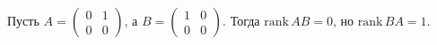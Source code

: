 \documentclass{article}
\begin{document}
Пусть $A = \begin{pmatrix}0&1\\0&0\end{pmatrix}$, а $B = \begin{pmatrix}1&0\\0&0\end{pmatrix}$. 
Тогда $\mathrm{rank}\,AB = 0$, но $\mathrm{rank}\,BA = 1$.
\end{document}
